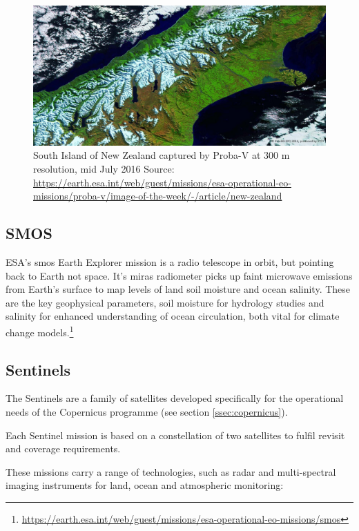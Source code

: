 \documentclass{article}
\begin{document}
\begin{figure}[h!]    
\centering
\label{fig:nz_probaV}
\includegraphics[width=\linewidth]{figures/New-Zealand_probaV.png}
\caption{South Island of New Zealand captured by Proba-V at 300 m resolution, mid July 2016
Source: \url{https://earth.esa.int/web/guest/missions/esa-operational-eo-missions/proba-v/image-of-the-week/-/article/new-zealand
}}
\end{figure}

\subsection{SMOS}

ESA's \ac{smos} Earth Explorer mission is a radio telescope in orbit, but pointing back to Earth not space. It's \ac{miras} radiometer picks up faint microwave emissions from Earth's surface to map levels of land soil moisture and ocean salinity. These are the key geophysical parameters, soil moisture for hydrology studies and salinity for enhanced understanding of ocean circulation, both vital for climate change models.\footnote{\url{https://earth.esa.int/web/guest/missions/esa-operational-eo-missions/smos}}


\subsection{Sentinels}
\label{ssec:sentinels}

The Sentinels are a family of satellites developed specifically for the operational needs of the Copernicus programme (see section \ref{ssec:copernicus}). 

Each Sentinel mission is based on a constellation of two satellites to fulfil revisit and coverage requirements. 

These missions carry a range of technologies, such as radar and multi-spectral imaging instruments for land, ocean and atmospheric monitoring:
\end{document}
